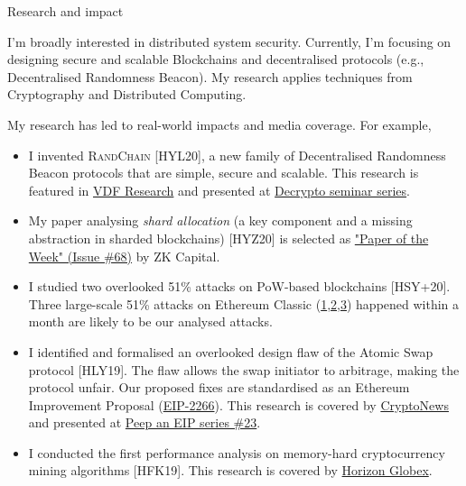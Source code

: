 \documentclass{resume} %
\begin{document}
\begin{rSection}{Research and impact}

    I'm broadly interested in distributed system security.
    Currently, I'm focusing on designing secure and scalable Blockchains and decentralised protocols (e.g., Decentralised Randomness Beacon).
    My research applies techniques from Cryptography and Distributed Computing.

    My research has led to real-world impacts and media coverage. For example,
    \begin{itemize}
        \item I invented \textsc{RandChain} [HYL20], a new family of Decentralised Randomness Beacon protocols that are simple, secure and scalable. This research is featured in \href{https://vdfresearch.org/}{VDF Research} and presented at \href{https://decrypto.org/seminar/}{Decrypto seminar series}.
        \item My paper analysing \emph{shard allocation} (a key component and a missing abstraction in sharded blockchains) [HYZ20] is selected as \href{https://zkcapital.substack.com/}{"Paper of the Week" (Issue \#68)} by ZK Capital.
        \item I studied two overlooked 51\% attacks on PoW-based blockchains [HSY+20]. Three large-scale 51\% attacks on Ethereum Classic (\href{https://news.bitcoin.com/ethereum-classic-suffers-51-attack-again-delisting-risk-amplified}{1},\href{https://decrypt.co/40196/hackers-launch-third-51-attack-on-ethereum-classic-this-month}{2},\href{https://coingeek.com/over-1m-double-spent-in-latest-ethereum-classic-51-attack}{3}) happened within a month are likely to be our analysed attacks.
        \item I identified and formalised an overlooked design flaw of the Atomic Swap protocol [HLY19]. The flaw allows the swap initiator to arbitrage, making the protocol unfair. Our proposed fixes are standardised as an Ethereum Improvement Proposal (\href{https://github.com/ethereum/EIPs/issues/2266}{EIP-2266}). This research is covered by \href{https://cryptonews.com.au/monash-university-researchers-developing-cryptocurrency-transaction-platform}{CryptoNews} and presented at \href{https://www.youtube.com/watch?v=wwWcfl9N65k}{Peep an EIP series \#23}.
        \item I conducted the first performance analysis on memory-hard cryptocurrency mining algorithms [HFK19]. This research is covered by \href{https://medium.com/@horizonfintex/blockchain-research-bytes-1-9d023e080765}{Horizon Globex}.
    \end{itemize}

\end{rSection}
\end{document}
